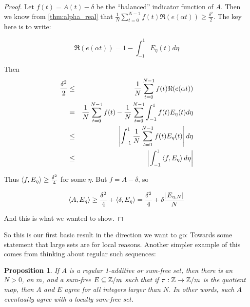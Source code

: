 \documentclass{report}
\newtheorem{proposition}[theorem]{Proposition}
\theoremstyle{remark}
\numberwithin{equation}{section}
\begin{document}
\begin{proof}
  Let $f(t) = A(t) - \delta$ be the ``balanced'' indicator function of
  $A$.  Then we know from \ref{thm:alpha_real} that $\frac{1}{N}\sum_{t=0}^{N-1}
  f(t)\Re(e(\alpha t)) \geq \frac{\delta^2}{2}$.  The key here is to
  write: 

  \[\Re(e(\alpha t)) = 1-\int_{-1}^1 E_\eta(t)d\eta\]

  Then 
  \begin{eqnarray*}
    \frac{\delta^2}{2} &\leq& \frac{1}{N}\sum_{t=0}^{N-1}
                              f(t)\Re(e(\alpha t)) \\
                       &=& \frac{1}{N}\sum_{t=0}^{N-1}
                           f(t) -  \frac{1}{N}\sum_{t=0}^{N-1}
                           \int_{-1}^1 f(t) E_\eta(t)d\eta\\
                       &\leq& \left|\int_{-1}^1 \frac{1}{N}\sum_{t=0}^{N-1} f(t) E_\eta(t)\right|d\eta\\
                       &\leq& \left|\int_{-1}^1 \left<f, E_\eta\right> d\eta\right|
\end{eqnarray*}

{\color{blue}Thus $\left<f, E_\eta\right> \geq \frac{\delta^2}{4}$ for some $\eta$.  }But
$f = A - \delta$, so 

\[\left<A, E_\eta\right> \geq \frac{\delta^2}{4} + \left<\delta, E_\eta\right> =
  \frac{\delta^2}{4} + \delta \frac{|E_{\eta,N}|}{N}\]

And this is what we wanted to show.
\end{proof}

So this is our first basic result in the direction we want to go:
Towards some statement that large \relevant sets are \relevant for
local reasons.  Another simpler example of this comes from thinking
about regular such sequences: 

\begin{proposition}\label{prop:regular_sumfree}
  If $A$ is a regular 1-additive or sum-free set, then there is an
  $N > 0$, an $m$, and a sum-free $E \subseteq \mathbb{Z}/m$ such that if
  $\pi : \mathbb{Z} \to \mathbb{Z}/m$ is the quotient map, then $A$ and $E$ agree for
  all integers larger than $N$.  In other words, such $A$ eventually
  agree with a locally sum-free set. 
\end{proposition}
\end{document}

